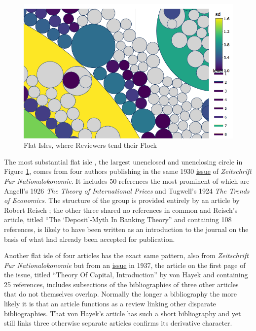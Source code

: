 \documentclass[]{book}
\theoremstyle{definition}
\theoremstyle{definition}
\theoremstyle{definition}
\theoremstyle{remark}
\begin{document}
\begin{figure}

{\centering \includegraphics[width=9.72in]{img/flat-isle} 

}

\caption{Flat Isles, where Reviewers tend their Flock}\label{fig:flat-isle}
\end{figure}

The most substantial flat isle , the largest unenclosed and unenclosing
circle in Figure \ref{fig:flat-isle}, comes from four authors publishing
in the same 1930 \href{https://www.jstor.org/stable/i40084238}{issue} of
\emph{Zeitschrift Fur Nationalokonomie}. It includes 50 references the
most prominent of which are Angell's 1926 \emph{The Theory of
International Prices} and Tugwell's 1924 \emph{The Trends of Economics}.
The structure of the group is provided entirely by an article by Robert
Reisch ; the other three shared no references in common and Reisch's
article, titled ``The `Deposit'-Myth In Banking Theory'' and containing
108 references, is likely to have been written as an introduction to the
journal on the basis of what had already been accepted for publication.

Another flat isle of four articles has the exact same pattern, also from
\emph{Zeitschrift Fur Nationalokonomie} but from an
\href{https://www.jstor.org/stable/i40084262}{issue} in 1937, the
article on the first page of the issue, titled ``Theory Of Capital,
Introduction'' by von Hayek and containing 25 references, includes
subsections of the bibliographies of three other articles that do not
themselves overlap. Normally the longer a bibliography the more likely
it is that an article functions as a review linking other disparate
bibliographies. That von Hayek's article has such a short bibliography
and yet still links three otherwise separate articles confirms its
derivative character.
\end{document}

